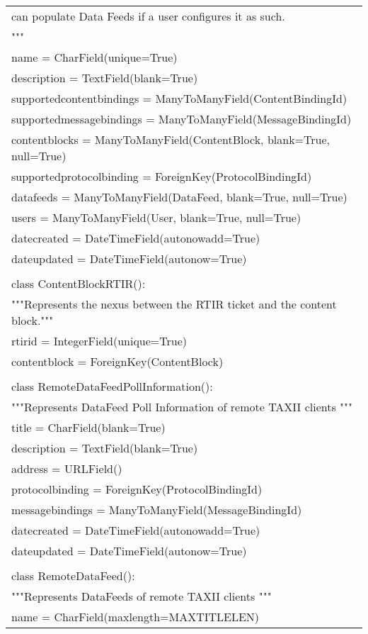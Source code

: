 \begin{center}
\begin{longtable}{|l|}
	    can populate Data Feeds if a user configures it as such.\\
	    """\\
	    name = CharField(unique=True)\\
	    description = TextField(blank=True)\\
	    supportedcontentbindings = ManyToManyField(ContentBindingId)\\
	    supportedmessagebindings = ManyToManyField(MessageBindingId)\\
	    contentblocks = ManyToManyField(ContentBlock, blank=True, null=True)\\
	    supportedprotocolbinding = ForeignKey(ProtocolBindingId)\\
	    datafeeds = ManyToManyField(DataFeed, blank=True, null=True)\\
	    users = ManyToManyField(User, blank=True, null=True)\\
	    datecreated = DateTimeField(autonowadd=True)\\
	    dateupdated = DateTimeField(autonow=True)\\
	\\
	class ContentBlockRTIR():\\
	    """Represents the nexus between the RTIR ticket and the content block."""\\
	    rtirid = IntegerField(unique=True)\\
	    contentblock = ForeignKey(ContentBlock)\\
	\\
	class RemoteDataFeedPollInformation():\\
	    """Represents DataFeed Poll Information of remote TAXII clients """\\
	    title = CharField(blank=True)\\
	    description = TextField(blank=True)\\
	    address = URLField()\\
	    protocolbinding = ForeignKey(ProtocolBindingId)\\
	    messagebindings = ManyToManyField(MessageBindingId)\\
	    datecreated = DateTimeField(autonowadd=True)\\
	    dateupdated = DateTimeField(autonow=True)\\
	\\
	class RemoteDataFeed():\\
	    """Represents DataFeeds of remote TAXII clients """\\
	    name = CharField(maxlength=MAXTITLELEN)\\

\end{longtable}
\end{center}
